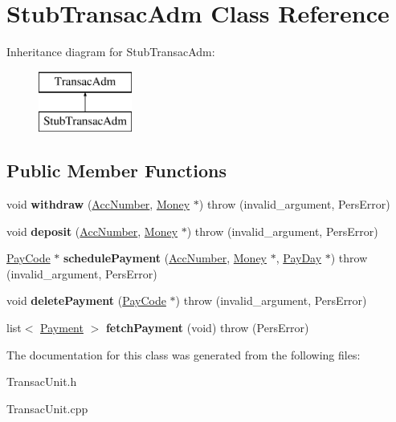 \hypertarget{classStubTransacAdm}{\section{Stub\-Transac\-Adm Class Reference}
\label{d9/d0f/classStubTransacAdm}
}
Inheritance diagram for Stub\-Transac\-Adm\-:\begin{figure}[H]
\begin{center}
\leavevmode
\includegraphics[height=2.000000cm]{d9/d0f/classStubTransacAdm}
\end{center}
\end{figure}
\subsection*{Public Member Functions}
\begin{DoxyCompactItemize}
\item 
\hypertarget{classStubTransacAdm_aa411e937e159c26aa50901aad504db42}{void {\bfseries withdraw} (\hyperlink{classAccNumber}{Acc\-Number}, \hyperlink{classMoney}{Money} $\ast$)  throw (invalid\-\_\-argument, Pers\-Error)}\label{d9/d0f/classStubTransacAdm_aa411e937e159c26aa50901aad504db42}

\item 
\hypertarget{classStubTransacAdm_afc25824382e5ce8cd491a573b557bbc1}{void {\bfseries deposit} (\hyperlink{classAccNumber}{Acc\-Number}, \hyperlink{classMoney}{Money} $\ast$)  throw (invalid\-\_\-argument, Pers\-Error)}\label{d9/d0f/classStubTransacAdm_afc25824382e5ce8cd491a573b557bbc1}

\item 
\hypertarget{classStubTransacAdm_ad794a9d6f46b1f4d62aef292f8fed5f4}{\hyperlink{classPayCode}{Pay\-Code} $\ast$ {\bfseries schedule\-Payment} (\hyperlink{classAccNumber}{Acc\-Number}, \hyperlink{classMoney}{Money} $\ast$, \hyperlink{classPayDay}{Pay\-Day} $\ast$)  throw (invalid\-\_\-argument, Pers\-Error)}\label{d9/d0f/classStubTransacAdm_ad794a9d6f46b1f4d62aef292f8fed5f4}

\item 
\hypertarget{classStubTransacAdm_a734de9620871592c6d40b2c819c69650}{void {\bfseries delete\-Payment} (\hyperlink{classPayCode}{Pay\-Code} $\ast$)  throw (invalid\-\_\-argument, Pers\-Error)}\label{d9/d0f/classStubTransacAdm_a734de9620871592c6d40b2c819c69650}

\item 
\hypertarget{classStubTransacAdm_a0896f821752fc696322bd58444a1d5ab}{list$<$ \hyperlink{classPayment}{Payment} $>$ {\bfseries fetch\-Payment} (void)  throw (\-Pers\-Error)}\label{d9/d0f/classStubTransacAdm_a0896f821752fc696322bd58444a1d5ab}

\end{DoxyCompactItemize}


The documentation for this class was generated from the following files\-:\begin{DoxyCompactItemize}
\item 
Transac\-Unit.\-h\item 
Transac\-Unit.\-cpp\end{DoxyCompactItemize}

